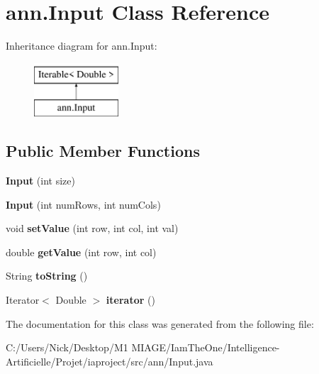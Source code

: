 \hypertarget{classann_1_1_input}{}\section{ann.\+Input Class Reference}
\label{classann_1_1_input}
Inheritance diagram for ann.\+Input\+:\begin{figure}[H]
\begin{center}
\leavevmode
\includegraphics[height=2.000000cm]{classann_1_1_input}
\end{center}
\end{figure}
\subsection*{Public Member Functions}
\begin{DoxyCompactItemize}
\item 
\mbox{\label{classann_1_1_input_a58e4d4bd454620c64b162792f05398a8}} 
{\bfseries Input} (int size)
\item 
\mbox{\label{classann_1_1_input_a56db4af5fd8a2888e14cf6610b1b9067}} 
{\bfseries Input} (int num\+Rows, int num\+Cols)
\item 
\mbox{\label{classann_1_1_input_ac57941ba7f3a4562e90d4a686e274cb6}} 
void {\bfseries set\+Value} (int row, int col, int val)
\item 
\mbox{\label{classann_1_1_input_a997d6cbb6b015e32b884f1763c3709c2}} 
double {\bfseries get\+Value} (int row, int col)
\item 
\mbox{\label{classann_1_1_input_a10cf38f57f0f5351e99c3ad997035b4c}} 
String {\bfseries to\+String} ()
\item 
\mbox{\label{classann_1_1_input_abde8c7c03ebcaceebc918afb3d3a49e1}} 
Iterator$<$ Double $>$ {\bfseries iterator} ()
\end{DoxyCompactItemize}


The documentation for this class was generated from the following file\+:\begin{DoxyCompactItemize}
\item 
C\+:/\+Users/\+Nick/\+Desktop/\+M1 M\+I\+A\+G\+E/\+Iam\+The\+One/\+Intelligence-\/\+Artificielle/\+Projet/iaproject/src/ann/Input.\+java\end{DoxyCompactItemize}
